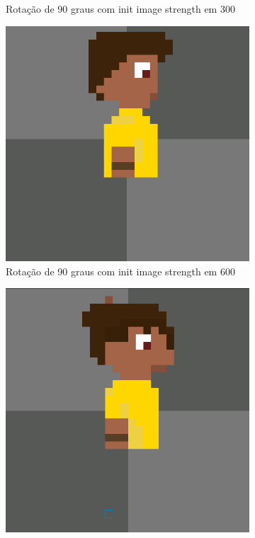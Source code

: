 \begin{figure}[htbp]
\begin{subfigure}{0.32\linewidth}
        \caption{\small Rotação de 90 graus com init image strength em 300}
        \label{fig:pixelLabRotacao11c}
    \end{subfigure}
    \begin{subfigure}{0.32\linewidth}
        \includegraphics[width=1\linewidth]{figs/pixelLab/dia2/rot45fix3init1res4.PNG}
        \caption{\small Rotação de 90 graus com init image strength em 600}
        \label{fig:pixelLabRotacao11d}
    \end{subfigure}
    \begin{subfigure}{0.32\linewidth}
        \includegraphics[width=1\linewidth]{figs/pixelLab/dia2/rot45fix3init1res5.PNG}

\end{subfigure}
\end{figure}
